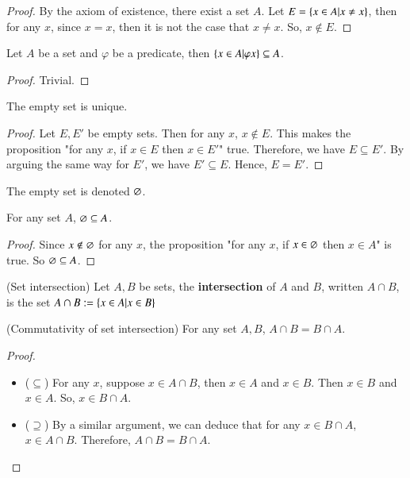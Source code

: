 \begin{proof}
    By the axiom of existence, there exist a set $A$. Let $E = \{x\in A|x\neq x\}$, then for any $x$, since $x=x$, then it is not the case that $x\neq x$. So, $x\not\in E$.
\end{proof}
\begin{prop}
    Let $A$ be a set and $\varphi$ be a predicate, then $\{x\in A|\varphi x\}\subseteq A$.
\end{prop}
\begin{proof}
    Trivial.
\end{proof}
\begin{prop}
    The empty set is unique. 
\end{prop}
\begin{proof}
    Let $E,E'$ be empty sets. Then for any $x$, $x\not\in E$. This makes the proposition "for any $x$, if $x\in E$ then $x\in E'$" true. Therefore, we have $E\subseteq E'$. By arguing the same way for $E'$, we have $E'\subseteq E$. Hence, $E= E'$.
\end{proof}
\begin{rem}
    The empty set is denoted $\varnothing$.
\end{rem}
\begin{prop}
    For any set $A$, $\varnothing\subseteq A$.
\end{prop}
\begin{proof}
    Since $x\not\in\varnothing$ for any $x$, the proposition "for any $x$, if $x\in \varnothing$ then $x\in A$" is true. So $\varnothing\subseteq A$.
\end{proof}
\begin{defn}
    (Set intersection) Let $A,B$ be sets, the \textbf{intersection} of $A$ and $B$, written $A\cap B$, is the set $A\cap B:= \{x\in A|x\in B\}$
\end{defn}
\begin{prop}
    (Commutativity of set intersection) For any set $A,B$, $A\cap B = B\cap A$.
\end{prop}
\begin{proof}
    ~
    \begin{itemize}
        \item ($\subseteq$) For any $x$, suppose $x\in A\cap B$, then $x\in A$ and $x\in B$. Then $x\in B$ and $x\in A$. So, $x\in B\cap A$.
        \item ($\supseteq$) By a similar argument, we can deduce that for any $x\in B\cap A$, $x\in A\cap B$.
        Therefore, $A\cap B = B\cap A$.
    \end{itemize}
\end{proof}
